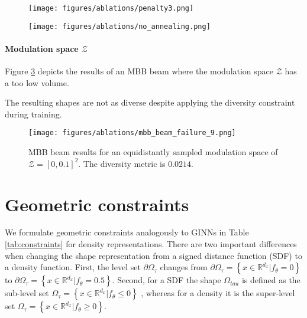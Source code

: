 \begin{figure*}[ht!]
\centering
\begin{subfigure}[t]{0.4\textwidth}
    \centering
    \texttt{[image: figures/ablations/penalty3.png]}
    \caption{}%
    \label{fig:jeb_p3}
\end{subfigure}
\hfill
\begin{subfigure}[t]{0.4\textwidth}
    \centering
    \texttt{[image: figures/ablations/no\_annealing.png]}
    \caption{}%
    \label{fig:jeb_no_annealing}
\end{subfigure}

\caption{
Ablations for penalty and $\beta$ annealing.
(a) Jet engine bracket trained with penalty $p=3$.
(b) Jet engine bracket trained without annealing.
}
\label{fig:ablations_annealing_penalty}
\end{figure*}

\paragraph{Modulation space $\mathcal{Z}$}
Figure \ref{fig:failure_modulation} depicts the results of an MBB beam where the modulation space $\mathcal{Z}$ has a too low volume.

The resulting shapes are not as diverse despite applying the diversity constraint during training.


\begin{figure}
    \centering
    \texttt{[image: figures/ablations/mbb\_beam\_failure\_9.png]}
    \caption{MBB beam results for an equidistantly sampled modulation space of $\mathcal{Z} = [0,0.1]^2$. The diversity metric is $0.0214$.}
    \label{fig:failure_modulation}
\end{figure}

\section{Geometric constraints}
\label{app:constraints}
We formulate geometric constraints analogously to GINNs in Table \ref{tab:constraints} for density representations.
There are two important differences when changing the shape representation from a signed distance function (SDF) to a density function.\newline
First, the level set $\partial \Omega_{\tau}$ changes from 
$ \partial \Omega_{\tau} = \left\{x \in \mathbb{R}^{d_x} | f_{\theta} = 0 \right\}$ to $ \partial \Omega_{\tau} = \left\{x \in \mathbb{R}^{d_x} | f_{\theta} = 0.5 \right\}$.
Second, for a SDF the shape $\Omega_{tau}$ is defined as the sub-level set $\Omega_{\tau} = \left\{x \in \mathbb{R}^{d_x} | f_{\theta} \leq 0 \right\}$ , whereas for a density it is the super-level set $\Omega_{\tau} = \left\{x \in \mathbb{R}^{d_x} | f_{\theta} \geq 0 \right\}$. 


